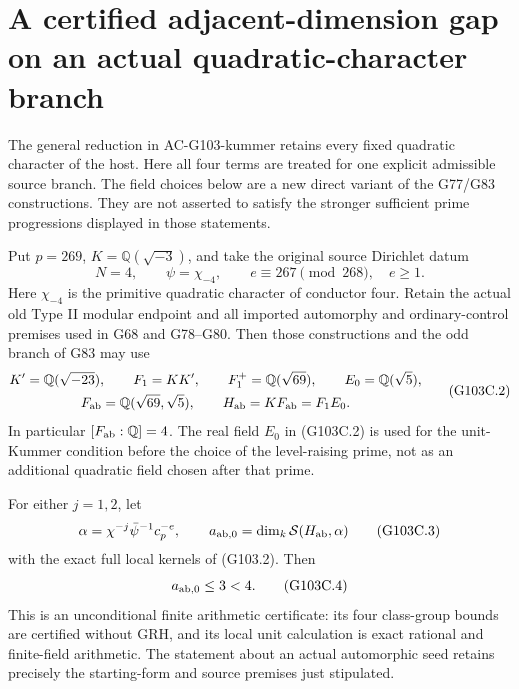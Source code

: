 \section{A certified adjacent-dimension gap on an actual quadratic-character branch}
\label{sec:cubic-explicit-adjacent-certificate}

The general reduction in AC-G103-kummer retains every fixed quadratic
character of the host.  Here all four terms are treated for one explicit
admissible source branch.  The field choices below are a new direct
variant of the G77/G83 constructions.  They are not asserted to satisfy
the stronger sufficient prime progressions displayed in those statements.

\begin{theorem}
\label{thm:ACG103certificate}
Put $p=269$, $K=\mathbb Q(\sqrt{-3})$, and take the original source
Dirichlet datum
\[
       N=4,\qquad \psi=\chi_{-4},\qquad
       e\equiv267\pmod{268},\quad e\ge1.
       \tag{G103C.1}
\]
Here $\chi_{-4}$ is the primitive quadratic character of conductor four.
Retain the actual old Type II modular endpoint and all imported
automorphy and ordinary-control premises used in G68 and G78--G80.
Then those constructions and the odd branch of G83 may use
\[
 \begin{gathered}
 K'=\mathbb Q(\sqrt{-23}),\qquad F_1=KK',\qquad
 F_1^+=\mathbb Q(\sqrt{69}),\qquad E_0=\mathbb Q(\sqrt5),\\
 F_{\rm ab}=\mathbb Q(\sqrt{69},\sqrt5),\qquad
 H_{\rm ab}=KF_{\rm ab}=F_1E_0.
 \end{gathered}                                      \tag{G103C.2}
\]
In particular $[F_{\rm ab}:\mathbb Q]=4$.
The real field $E_0$ in (G103C.2) is used for the unit-Kummer condition
before the choice of the level-raising prime, not as an additional
quadratic field chosen after that prime.

For either $j=1,2$, let
\[
       \alpha=\chi^{-j}\bar\psi^{-1}c_p^{-e},\qquad
       a_{{\rm ab},0}=\dim_k\mathcal S(H_{\rm ab},\alpha)
                                                        \tag{G103C.3}
\]
with the exact full local kernels of (G103.2).  Then
\[
                         a_{{\rm ab},0}\le3<4.
                                                        \tag{G103C.4}
\]
This is an unconditional finite arithmetic certificate: its four
class-group bounds are certified without GRH, and its local unit
calculation is exact rational and finite-field arithmetic.
The statement about an actual automorphic seed retains precisely the
starting-form and source premises just stipulated.


\end{theorem}
